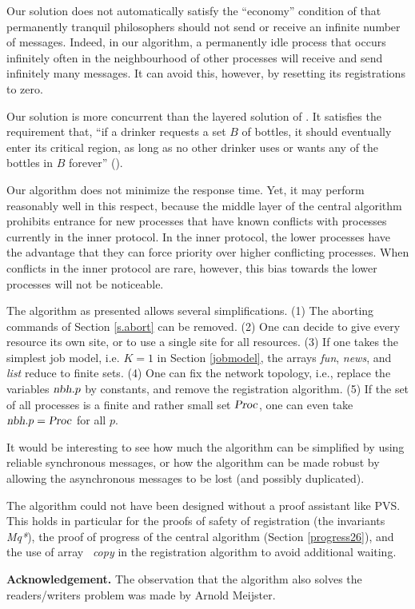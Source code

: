 \documentclass[10pt]{article} \usepackage[english]{babel}
\def\S #1/{\mbox {\textsl{#1}}}
\def\B #1/{\mbox {\textbf{#1}}}
\def\sbreak {\smallbreak\noindent}
\begin{document}
Our solution does not automatically satisfy the ``economy'' condition
of \cite{ChM84} that permanently tranquil philosophers should not send
or receive an infinite number of messages. Indeed, in our algorithm, a
permanently idle process that occurs infinitely often in the
neighbourhood of other processes will receive and send infinitely many
messages.  It can avoid this, however, by resetting its registrations
to zero.

Our solution is more concurrent than the layered solution of
\cite{WeL93}. It satisfies the requirement that, ``if a drinker
requests a set $B$ of bottles, it should eventually enter its critical
region, as long as no other drinker uses or wants any of the bottles
in $B$ forever'' (\cite[p.\ 243]{WeL93}).

Our algorithm does not minimize the response time.  Yet, it may
perform reasonably well in this respect, because the middle layer of
the central algorithm prohibits entrance for new processes that have
known conflicts with processes currently in the inner protocol.  In
the inner protocol, the lower processes have the advantage that they
can force priority over higher conflicting processes.  When conflicts
in the inner protocol are rare, however, this bias towards the lower
processes will not be noticeable.

The algorithm as presented allows several simplifications.  (1) The
aborting commands of Section \ref{s.abort} can be removed.  (2) One
can decide to give every resource its own site, or to use a single
site for all resources.  (3) If one takes the simplest job model,
i.e. $K=1$ in Section \ref{jobmodel}, the arrays \S fun/, \S news/,
and \S list/ reduce to finite sets.  (4) One can fix the network
topology, i.e., replace the variables $\S nbh/.p$ by constants, and
remove the registration algorithm.  (5) If the set of all processes is
a finite and rather small set $\S Proc/$, one can even take $\S nbh/.p
= \S Proc/$ for all $p$.

It would be interesting to see how much the algorithm can be
simplified by using reliable synchronous messages, or how the
algorithm can be made robust by allowing the asynchronous messages to
be lost (and possibly duplicated).

The algorithm could not have been designed without a proof assistant
like PVS.  This holds in particular for the proofs of safety of
registration (the invariants \S Mq*/), the proof of progress of the
central algorithm (Section \ref{progress26}), and the use of array \S
copy/ in the registration algorithm to avoid additional waiting.

\sbreak \B Acknowledgement./ The observation that the algorithm also
solves the readers/writers problem was made by Arnold Meijster.

 
\end{document}
